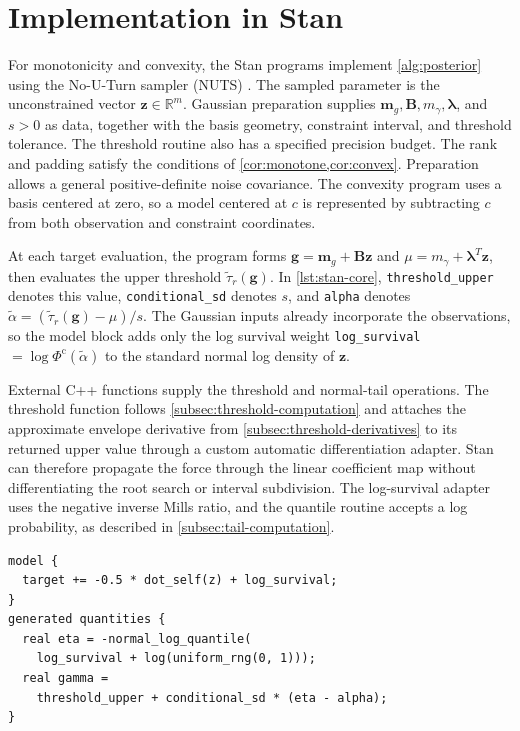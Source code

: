 \section{Implementation in Stan}\label{app:stan-implementation}

For monotonicity and convexity, the Stan programs implement
\cref{alg:posterior} using the No-U-Turn sampler (NUTS)
\citep{hoffman2014nuts,carpenter2017stan}. The sampled parameter is
the unconstrained vector $\boldsymbol z\in\mathbb R^m$. Gaussian
preparation supplies $\boldsymbol m_g,\boldsymbol B,m_\gamma,
\boldsymbol\lambda$, and $s>0$ as data, together with the basis
geometry, constraint interval, and threshold tolerance. The threshold
routine also has a specified precision budget. The rank and padding satisfy the conditions of
\cref{cor:monotone,cor:convex}. Preparation allows a general
positive-definite noise covariance. The convexity program uses a basis
centered at zero, so a model centered at $c$ is represented by
subtracting $c$ from both observation and constraint coordinates.

At each target evaluation, the program forms
$\boldsymbol g=\boldsymbol m_g+\boldsymbol B\boldsymbol z$ and
$\mu=m_\gamma+\boldsymbol\lambda^T\boldsymbol z$, then evaluates
the upper threshold $\widetilde\tau_r(\boldsymbol g)$.
In \cref{lst:stan-core}, \texttt{threshold\_upper} denotes this
value, \texttt{conditional\_sd} denotes $s$, and
\texttt{alpha} denotes
$\widetilde\alpha=(\widetilde\tau_r(\boldsymbol g)-\mu)/s$.
The Gaussian inputs already incorporate the observations, so the
model block adds only the log survival weight
\texttt{log\_survival}$=\log\Phi^{\mathrm c}(\widetilde\alpha)$ to the
standard normal log density of $\boldsymbol z$.

External C++ functions supply the threshold and normal-tail operations.
The threshold function follows
\cref{subsec:threshold-computation} and attaches the approximate
envelope derivative from \cref{subsec:threshold-derivatives} to
its returned upper value through a custom automatic differentiation
adapter. Stan can therefore propagate the force through the linear
coefficient map without differentiating the root search or interval
subdivision. The log-survival adapter uses the negative inverse
Mills ratio, and the quantile routine accepts a log probability,
as described in \cref{subsec:tail-computation}.

\begin{listing}[htbp]
\begin{verbatim}
model {
  target += -0.5 * dot_self(z) + log_survival;
}
generated quantities {
  real eta = -normal_log_quantile(
    log_survival + log(uniform_rng(0, 1)));
  real gamma =
    threshold_upper + conditional_sd * (eta - alpha);
}
\end{verbatim}
\caption{Marginal sampling and conditional reconstruction in Stan.
The excerpt assumes that the Gaussian transformations, upper threshold,
and log survival weight have been evaluated. The generic routine
\texttt{normal\_log\_quantile} returns $\Phi^{-1}(\exp(\ell))$
from a supplied log probability $\ell$.}
\label{lst:stan-core}
\end{listing}

